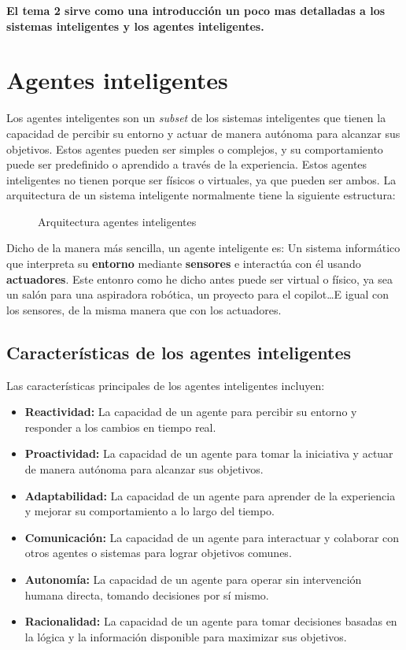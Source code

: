 \textbf{El tema 2 sirve como una introducción un poco mas detalladas a los sistemas inteligentes y los agentes inteligentes.}


\section{Agentes inteligentes}

Los agentes inteligentes son un \textit{subset} de los sistemas inteligentes que tienen la capacidad de percibir su entorno y actuar de manera autónoma para alcanzar sus objetivos. Estos agentes pueden ser simples o complejos, y su comportamiento puede ser predefinido o aprendido a través de la experiencia.
Estos agentes inteligentes no tienen porque ser físicos o virtuales, ya que pueden ser ambos. La arquitectura de un sistema inteligente normalmente tiene la siguiente estructura:

\begin{figure}[htbp]
    \centering
    
    \caption{Arquitectura agentes inteligentes}
    \label{fig:agentes_inteligentes}
\end{figure}

Dicho de la manera más sencilla, un agente inteligente es: Un sistema informático que interpreta su \textbf{entorno} mediante \textbf{sensores} e interactúa con él usando \textbf{actuadores}. Este entonro como he dicho antes puede ser virtual o físico, ya sea un salón para una aspiradora robótica, un proyecto para el copilot\dots E igual con los sensores, de la misma manera que con los actuadores.

\subsection{Características de los agentes inteligentes}

Las características principales de los agentes inteligentes incluyen:

\begin{itemize}
    \item \textbf{Reactividad:} La capacidad de un agente para percibir su entorno y responder a los cambios en tiempo real.
    \item \textbf{Proactividad:} La capacidad de un agente para tomar la iniciativa y actuar de manera autónoma para alcanzar sus objetivos.
    \item \textbf{Adaptabilidad:} La capacidad de un agente para aprender de la experiencia y mejorar su comportamiento a lo largo del tiempo.
    \item \textbf{Comunicación:} La capacidad de un agente para interactuar y colaborar con otros agentes o sistemas para lograr objetivos comunes.
    \item \textbf{Autonomía:} La capacidad de un agente para operar sin intervención humana directa, tomando decisiones por sí mismo.
    \item \textbf{Racionalidad:} La capacidad de un agente para tomar decisiones basadas en la lógica y la información disponible para maximizar sus objetivos.
\end{itemize}

